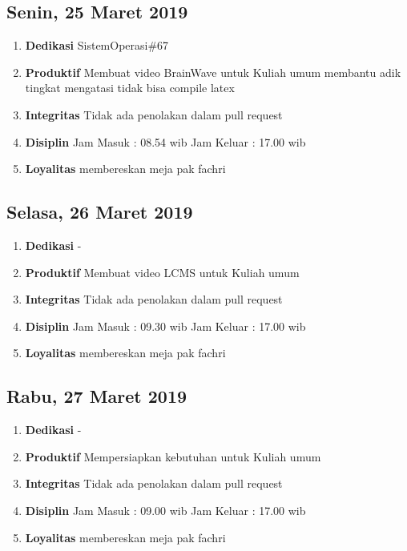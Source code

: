 \subsection{Senin, 25 Maret 2019}
\begin{enumerate}
\item \textbf{Dedikasi}
\subitem SistemOperasi\#67
\item \textbf{Produktif}
\subitem Membuat video BrainWave untuk Kuliah umum
\subitem membantu adik tingkat mengatasi tidak bisa compile latex
\item \textbf{Integritas}
\subitem Tidak ada penolakan dalam pull request
\item \textbf{Disiplin}
\subitem Jam Masuk : 08.54 wib
\subitem Jam Keluar : 17.00 wib
\item \textbf{Loyalitas}
\subitem membereskan meja pak fachri
\end{enumerate}

\subsection{Selasa, 26 Maret 2019}
\begin{enumerate}
\item \textbf{Dedikasi}
\subitem -
\item \textbf{Produktif}
\subitem Membuat video LCMS untuk Kuliah umum
\item \textbf{Integritas}
\subitem Tidak ada penolakan dalam pull request
\item \textbf{Disiplin}
\subitem Jam Masuk : 09.30 wib
\subitem Jam Keluar : 17.00 wib
\item \textbf{Loyalitas}
\subitem membereskan meja pak fachri
\end{enumerate}

\subsection{Rabu, 27 Maret 2019}
\begin{enumerate}
\item \textbf{Dedikasi}
\subitem -
\item \textbf{Produktif}
\subitem Mempersiapkan kebutuhan untuk Kuliah umum
\item \textbf{Integritas}
\subitem Tidak ada penolakan dalam pull request
\item \textbf{Disiplin}
\subitem Jam Masuk : 09.00 wib
\subitem Jam Keluar : 17.00 wib
\item \textbf{Loyalitas}
\subitem membereskan meja pak fachri
\end{enumerate}

